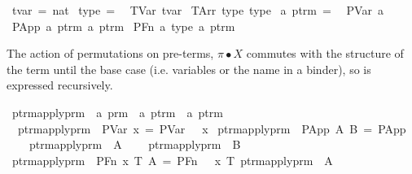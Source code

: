 \begin{implementation}
\isamarkupfalse%
\ tvar\ =\ nat\isanewline
\isanewline
{}\isamarkupfalse%
\ type\ =\isanewline
\ \ TVar\ tvar\isanewline
{\isacharbar}\ TArr\ type\ type\isanewline
\isanewline
{}\isamarkupfalse%
\ {\isacharprime}a\ ptrm\ =\isanewline
\ \ PVar\ {\isacharprime}a\isanewline
{\isacharbar}\ PApp\ {\isachardoublequoteopen}{\isacharprime}a\ ptrm{\isachardoublequoteclose}\ {\isachardoublequoteopen}{\isacharprime}a\ ptrm{\isachardoublequoteclose}\isanewline
{\isacharbar}\ PFn\ {\isacharprime}a\ type\ {\isachardoublequoteopen}{\isacharprime}a\ ptrm{\isachardoublequoteclose}
\end{implementation}

The action of permutations on pre-terms, \(\pi \bullet X\) commutes with the structure of the term until the base case (i.e. variables or the name in a binder), so is expressed recursively.

\begin{implementation}
\isamarkupfalse%
\ ptrm{\isacharunderscore}apply{\isacharunderscore}prm\ {\isacharcolon}{\isacharcolon}\ {\isachardoublequoteopen}{\isacharprime}a\ prm\ {\isasymRightarrow}\ {\isacharprime}a\ ptrm\ {\isasymRightarrow}\ {\isacharprime}a\ ptrm{\isachardoublequoteclose}\isanewline
\ \ {\isachardoublequoteopen}ptrm{\isacharunderscore}apply{\isacharunderscore}prm\ {\isasympi}\ {\isacharparenleft}PVar\ x{\isacharparenright}\ =\ PVar\ {\isacharparenleft}{\isasympi}\ {\isachardollar}\ x{\isacharparenright}{\isachardoublequoteclose}\isanewline
{\isacharbar}\ {\isachardoublequoteopen}ptrm{\isacharunderscore}apply{\isacharunderscore}prm\ {\isasympi}\ {\isacharparenleft}PApp\ A\ B{\isacharparenright}\ =\ PApp\isanewline
\ \ \ \ {\isacharparenleft}ptrm{\isacharunderscore}apply{\isacharunderscore}prm\ {\isasympi}\ A{\isacharparenright}\isanewline
\ \ \ \ {\isacharparenleft}ptrm{\isacharunderscore}apply{\isacharunderscore}prm\ {\isasympi}\ B{\isacharparenright}{\isachardoublequoteclose}\isanewline
{\isacharbar}\ {\isachardoublequoteopen}ptrm{\isacharunderscore}apply{\isacharunderscore}prm\ {\isasympi}\ {\isacharparenleft}PFn\ x\ T\ A{\isacharparenright}\ =\ PFn\ {\isacharparenleft}{\isasympi}\ {\isachardollar}\ x{\isacharparenright}\ T\ {\isacharparenleft}ptrm{\isacharunderscore}apply{\isacharunderscore}prm\ {\isasympi}\ A{\isacharparenright}{\isachardoublequoteclose}
\end{implementation}

